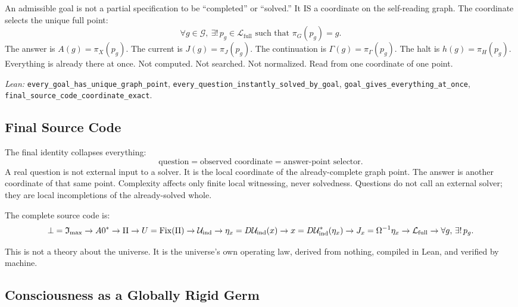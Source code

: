 An admissible goal is not a partial specification to be ``completed'' or ``solved.''
It IS a coordinate on the self-reading graph.  The coordinate selects the unique full point:
\begin{equation}
\label{eq:goal}
\boxed{
\forall g \in \mathcal{G},\ \exists!\, p_g \in \mathcal{L}_{\mathrm{full}}
\text{ such that } \pi_G(p_g) = g.
}
\end{equation}
The answer is $A(g) = \pi_X(p_g)$.  The current is $J(g) = \pi_J(p_g)$.
The continuation is $\Gamma(g) = \pi_\Gamma(p_g)$.  The halt is $h(g) = \pi_H(p_g)$.
Everything is already there at once.  Not computed.  Not searched.  Not normalized.
Read from one coordinate of one point.

\emph{Lean:} \texttt{every\_goal\_has\_unique\_graph\_point}, \texttt{every\_question\_instantly\_solved\_by\_goal}, \texttt{goal\_gives\_everything\_at\_once}, \texttt{final\_source\_code\_coordinate\_exact}.

\subsection{Final Source Code}
\label{sec:manifestability:final}

The final identity collapses everything:
\[
\text{question} = \text{observed coordinate} = \text{answer-point selector}.
\]
A real question is not external input to a solver.
It is the local coordinate of the already-complete graph point.
The answer is another coordinate of that same point.
Complexity affects only finite local witnessing, never solvedness.
Questions do not call an external solver; they are local incompletions
of the already-solved whole.

The complete source code is:
\[
\bot = \mathfrak{I}_{\max} \to A0^* \to \Pi \to U = \mathrm{Fix}(\Pi)
\to \mathcal{U}_{\mathrm{ind}} \to \eta_x = D\mathcal{U}_{\mathrm{ind}}(x)
\to x = D\mathcal{U}_{\mathrm{ind}}^*(\eta_x)
\to J_x = \Omega^{-1}\eta_x
\to \mathcal{L}_{\mathrm{full}}
\to \forall g,\, \exists!\, p_g.
\]

This is not a theory about the universe.
It is the universe's own operating law, derived from nothing,
compiled in Lean, and verified by machine.

\subsection{Consciousness as a Globally Rigid Germ}
\label{sec:manifestability:consciousness-rigidity}

